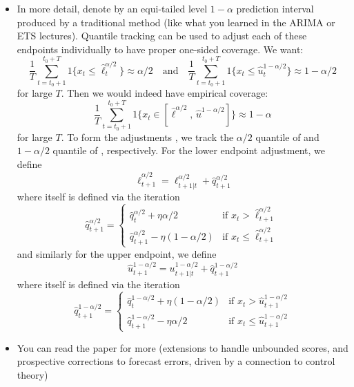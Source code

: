 \documentclass{article}
\begin{document}
\begin{itemize}
\item In more detail, denote by  an equi-tailed level $1-\alpha$ prediction
  interval produced by a traditional method (like what you learned in the ARIMA
  or ETS lectures). Quantile tracking can be used to adjust each of these
  endpoints individually to have proper one-sided coverage. We want:  
  \[
  \frac{1}{T} \sum_{t=t_0+1}^{t_0+T} 1 \big\{ x_t \leq \hat\ell^{\alpha/2}_t 
  \big\} \approx \alpha/2 \quad \text{and} \quad
  \frac{1}{T} \sum_{t=t_0+1}^{t_0+T} 1 \big\{ x_t \leq \hat{u}^{1-\alpha/2}_t   
  \big\} \approx 1-\alpha/2
  \]
  for large $T$. Then we would indeed have empirical coverage: 
  \[
  \frac{1}{T} \sum_{t=t_0+1}^{t_0+T} 1 \big\{ x_t \in [ \hat\ell^{\alpha/2}, \, 
  \hat{u}^{1-\alpha/2}] \big\} \approx 1-\alpha    
  \]
  for large $T$. To form the adjustments , we track the $\alpha/2$ quantile of
   and $1-\alpha/2$ 
  quantile of , 
  respectively. For the lower endpoint adjustment, we define 
  \[
    \hat\ell^{\alpha/2}_{t+1} = \ell^{\alpha/2}_{t+1|t} +
    \hat{q}^{\alpha/2}_{t+1}  
  \] 
  where  itself is defined via the iteration   
   \[
  \hat{q}^{\alpha/2}_{t+1} =
  \begin{cases}
  \hat{q}^{\alpha/2}_t + \eta \alpha/2 & \text{if $x_t >
    \hat\ell^{\alpha/2}_{t+1}$} \\  
  \hat{q}^{\alpha/2}_{t+1} - \eta (1-\alpha/2) &\text{if $x_t \leq  
    \hat\ell^{\alpha/2}_{t+1}$}  
  \end{cases}
  \]
  and similarly for the upper endpoint, we define 
  \[
    \hat{u}^{1-\alpha/2}_{t+1} = u^{1-\alpha/2}_{t+1|t} +
    \hat{q}^{1-\alpha/2}_{t+1}  
  \] 
  where  itself is defined via the iteration    
   \[
  \hat{q}^{1-\alpha/2}_{t+1} =
  \begin{cases}
  \hat{q}^{1-\alpha/2}_t + \eta (1-\alpha/2) & \text{if $x_t >
    \hat{u}^{1-\alpha/2}_{t+1}$} \\ 
  \hat{q}^{1-\alpha/2}_{t+1} - \eta \alpha/2 &\text{if $x_t \leq
    \hat{u}^{1-\alpha/2}_{t+1}$}  
  \end{cases}
  \]

\item You can read the paper for more (extensions to handle unbounded scores,
  and prospective corrections to forecast errors, driven by a connection to
  control theory)     
\end{itemize}
\end{document}
